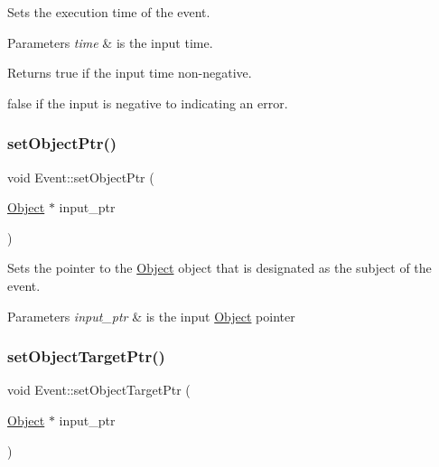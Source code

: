 Sets the execution time of the event. 


\begin{DoxyParams}{Parameters}
{\em time} & is the input time. \\
\hline
\end{DoxyParams}
\begin{DoxyReturn}{Returns}
true if the input time non-\/negative. 

false if the input is negative to indicating an error. 
\end{DoxyReturn}
\mbox{\label{class_event_a078cadde679fc042486ef065a097c7af}} 
\subsubsection{\texorpdfstring{set\+Object\+Ptr()}{setObjectPtr()}}
{\footnotesize\ttfamily void Event\+::set\+Object\+Ptr (\begin{DoxyParamCaption}\item[{\hyperlink{class_object}{Object} $\ast$}]{input\+\_\+ptr }\end{DoxyParamCaption})}



Sets the pointer to the \hyperlink{class_object}{Object} object that is designated as the subject of the event. 


\begin{DoxyParams}{Parameters}
{\em input\+\_\+ptr} & is the input \hyperlink{class_object}{Object} pointer \\
\hline
\end{DoxyParams}
\mbox{\label{class_event_a2e868dc951b6fec86703dcd7776680e0}} 
\subsubsection{\texorpdfstring{set\+Object\+Target\+Ptr()}{setObjectTargetPtr()}}
{\footnotesize\ttfamily void Event\+::set\+Object\+Target\+Ptr (\begin{DoxyParamCaption}\item[{\hyperlink{class_object}{Object} $\ast$}]{input\+\_\+ptr }\end{DoxyParamCaption})}



